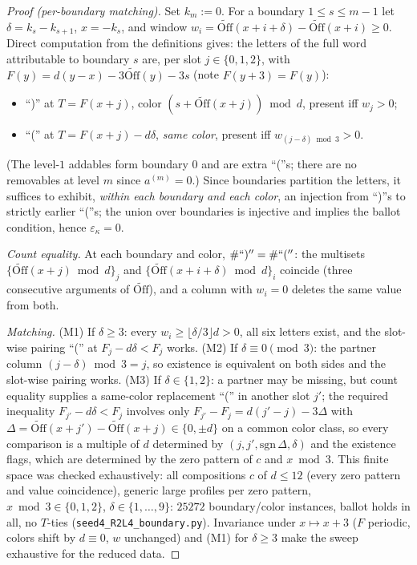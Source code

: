 \documentclass[11pt]{article}
\theoremstyle{definition}
\newcommand{\Off}{\mathrm{Off}}
\newcommand{\Offe}{\widetilde{\Off}}
\newcommand{\eps}{\varepsilon}
\begin{document}
\begin{proof}[Proof (per-boundary matching)]
Set $k_m:=0$. For a boundary $1\le s\le m-1$ let $\delta=k_s-k_{s+1}$,
$x=-k_s$, and window $w_i=\Offe(x+i+\delta)-\Offe(x+i)\ge0$. Direct
computation from the definitions gives: the letters of the full word
attributable to boundary $s$ are, per slot $j\in\{0,1,2\}$, with
$F(y)=d(y-x)-3\Offe(y)-3s$ (note $F(y+3)=F(y)$):
\begin{itemize}
\item ``)'' at $T=F(x+j)$, color $(s+\Offe(x+j))\bmod d$, present iff $w_j>0$;
\item ``('' at $T=F(x+j)-d\delta$, \emph{same color}, present iff
$w_{(j-\delta)\bmod 3}>0$.
\end{itemize}
(The level-$1$ addables form boundary $0$ and are extra ``(''s; there are no
removables at level $m$ since $a^{(m)}=0$.) Since boundaries partition the
letters, it suffices to exhibit, \emph{within each boundary and each color},
an injection from ``)''s to strictly earlier ``(''s; the union over
boundaries is injective and implies the ballot condition, hence
$\eps_\kappa=0$.

\emph{Count equality.} At each boundary and color, $\#``)''=\#``(''$: the
multisets $\{\Offe(x+j)\bmod d\}_j$ and $\{\Offe(x+i+\delta)\bmod d\}_i$
coincide (three consecutive arguments of $\Offe$), and a column with $w_i=0$
deletes the same value from both.

\emph{Matching.} (M1) If $\delta\ge3$: every $w_i\ge\lfloor\delta/3\rfloor
d>0$, all six letters exist, and the slot-wise pairing ``('' at
$F_j-d\delta<F_j$ works. (M2) If $\delta\equiv0\pmod 3$: the partner column
$(j-\delta)\bmod3=j$, so existence is equivalent on both sides and the
slot-wise pairing works. (M3) If $\delta\in\{1,2\}$: a partner may be
missing, but count equality supplies a same-color replacement ``('' in
another slot $j'$; the required inequality $F_{j'}-d\delta<F_j$ involves
only $F_{j'}-F_j=d(j'-j)-3\Delta$ with
$\Delta=\Offe(x+j')-\Offe(x+j)\in\{0,\pm d\}$ on a common color class, so
every comparison is a multiple of $d$ determined by $(j,j',\mathrm{sgn}\,
\Delta,\delta)$ and the existence flags, which are determined by the zero
pattern of $c$ and $x\bmod 3$. This finite space was checked exhaustively:
all compositions $c$ of $d\le12$ (every zero pattern and value coincidence),
generic large profiles per zero pattern, $x\bmod3\in\{0,1,2\}$,
$\delta\in\{1,\dots,9\}$: $25272$ boundary/color instances, ballot holds in
all, no $T$-ties (\texttt{seed4\_R2L4\_boundary.py}). Invariance under
$x\mapsto x+3$ ($F$ periodic, colors shift by $d\equiv0$, $w$ unchanged) and
(M1) for $\delta\ge3$ make the sweep exhaustive for the reduced data.
\end{proof}
\end{document}
